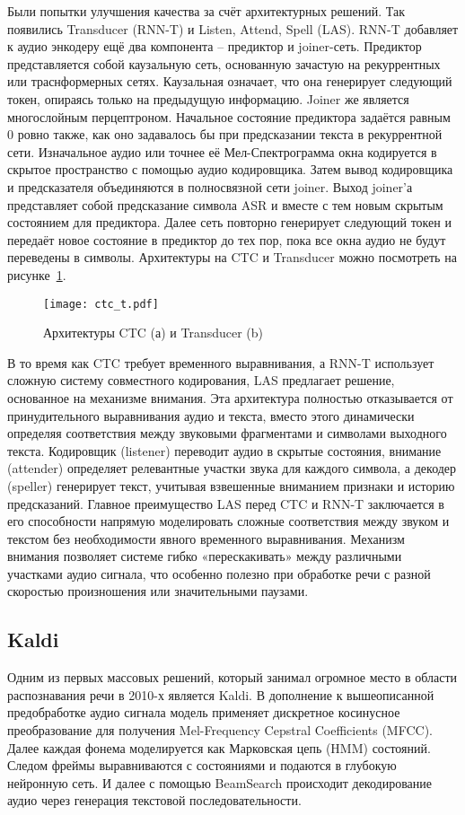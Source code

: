Были попытки улучшения качества за счёт архитектурных решений.
Так появились Transducer (RNN-T)\cite{graves2012sequence} и Listen, Attend, Spell (LAS)\cite{chan2016listen}.
RNN-T добавляет к аудио энкодеру ещё два компонента -- предиктор и joiner-сеть.
Предиктор представляется собой каузальную сеть, основанную зачастую на рекуррентных или траснформерных сетях.
Каузальная означает, что она генерирует следующий токен, опираясь только на предыдущую информацию.
Joiner же является многослойным перцептроном.
Начальное состояние предиктора задаётся равным 0 ровно также, как оно задавалось бы при предсказании текста в рекуррентной сети.
Изначальное аудио или точнее её Мел-Спектрограмма окна кодируется в скрытое пространство с помощью аудио кодировщика.
Затем вывод кодировщика и предсказателя объединяются в полносвязной сети joiner.
Выход joiner'а представляет собой предсказание символа ASR и вместе с тем новым скрытым состоянием для предиктора.
Далее сеть повторно генерирует следующий токен и передаёт новое состояние в предиктор до тех пор, пока все окна аудио не будут переведены в символы.
Архитектуры на CTC и Transducer можно посмотреть на рисунке~\ref{fig:ctc_t}.

\begin{figure}[!t]
  \centering
  \texttt{[image: ctc\_t.pdf]}
  \caption{Архитектуры CTC (а) и Transducer (b)}
  \label{fig:ctc_t}
\end{figure}

В то время как CTC требует временного выравнивания, а RNN-T использует сложную систему совместного кодирования, LAS предлагает решение, основанное на механизме внимания.
Эта архитектура полностью отказывается от принудительного выравнивания аудио и текста, вместо этого динамически определяя соответствия между звуковыми фрагментами и символами выходного текста.
Кодировщик (listener) переводит аудио в скрытые состояния, внимание (attender) определяет релевантные участки звука для каждого символа, а декодер (speller) генерирует текст, учитывая взвешенные вниманием признаки и историю предсказаний.
Главное преимущество LAS перед CTC и RNN-T заключается в его способности напрямую моделировать сложные соответствия между звуком и текстом без необходимости явного временного выравнивания.
Механизм внимания позволяет системе гибко «перескакивать» между различными участками аудио сигнала, что особенно полезно при обработке речи с разной скоростью произношения или значительными паузами.

\subsection{Kaldi}
Одним из первых массовых решений, который занимал огромное место в области распознавания речи в 2010-х является Kaldi\cite{povey2011kaldi}.
В дополнение к вышеописанной предобработке аудио сигнала модель применяет дискретное косинусное преобразование для получения Mel-Frequency Cepstral Coefficients (MFCC).
Далее каждая фонема моделируется как Марковская цепь (HMM) состояний.
Следом фреймы выравниваются с состояниями и подаются в глубокую нейронную сеть.
И далее с помощью BeamSearch происходит декодирование аудио через генерация текстовой последовательности.

